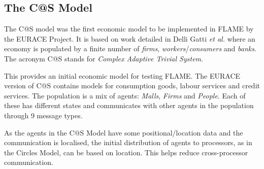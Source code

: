 \subsection{The C@S Model}
The C@S model was the first economic model to be implemented in FLAME by the EURACE Project.  It is based on work detailed in Delli Gatti \textsl{et al.} \cite{Delli Gatti} where an economy is populated by a finite number of \textsl{firms}, \textsl{workers}/\textsl{consumers} and \textsl{banks}. The acronym C@S stands for \textsl{Complex Adaptive Trivial System}.

This provides an initial economic model for testing FLAME. The EURACE version of C@S contains models for consumption goods, labour services and credit services. The population is a mix of agents: \textsl{Malls}, \textsl{Firms} and \textsl{People}. Each of these has different states and communicates with other agents in the population through 9 message types.

As the agents in the C@S Model have some positional/location data and the communication is localised, the initial distribution of agents to processors, as in the Circles Model, can be based on location. This helps reduce cross-processor communication.

